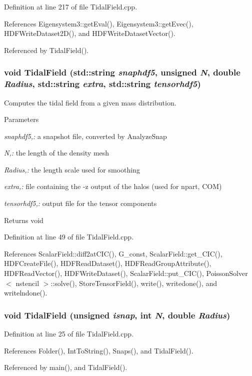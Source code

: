Definition at line 217 of file TidalField.cpp.



References Eigensystem3::getEval(), Eigensystem3::getEvec(), HDFWriteDataset2D(), and HDFWriteDatasetVector().



Referenced by TidalField().

\subsubsection[{TidalField}]{\setlength{\rightskip}{0pt plus 5cm}void TidalField (std::string {\em snaphdf5}, \/  unsigned {\em N}, \/  double {\em Radius}, \/  std::string {\em extra}, \/  std::string {\em tensorhdf5})}\label{TidalField_8h_abb7805a812bc26fb645ef7cc1790a8d0}


Computes the tidal field from a given mass distribution. 


\begin{DoxyParams}{Parameters}
\item[{\em snaphdf5,:}]a snapshot file, converted by AnalyzeSnap \item[{\em N,:}]the length of the density mesh \item[{\em Radius,:}]the length scale used for smoothing \item[{\em extra,:}]file containing the -\/z output of the halos (used for npart, COM) \item[{\em tensorhdf5,:}]output file for the tensor components \end{DoxyParams}
\begin{DoxyReturn}{Returns}
void 
\end{DoxyReturn}


Definition at line 49 of file TidalField.cpp.



References ScalarField::diff2atCIC(), G\_\-const, ScalarField::get\_\-CIC(), HDFCreateFile(), HDFReadDataset(), HDFReadGroupAttribute(), HDFReadVector(), HDFWriteDataset(), ScalarField::put\_\-CIC(), PoissonSolver$<$ nstencil $>$::solve(), StoreTensorField(), write(), writedone(), and writelndone().

\subsubsection[{TidalField}]{\setlength{\rightskip}{0pt plus 5cm}void TidalField (unsigned {\em isnap}, \/  int {\em N}, \/  double {\em Radius})}\label{TidalField_8h_ad67677b74fe6123a6f5403a9610aba03}


Definition at line 25 of file TidalField.cpp.



References Folder(), IntToString(), Snaps(), and TidalField().



Referenced by main(), and TidalField().

